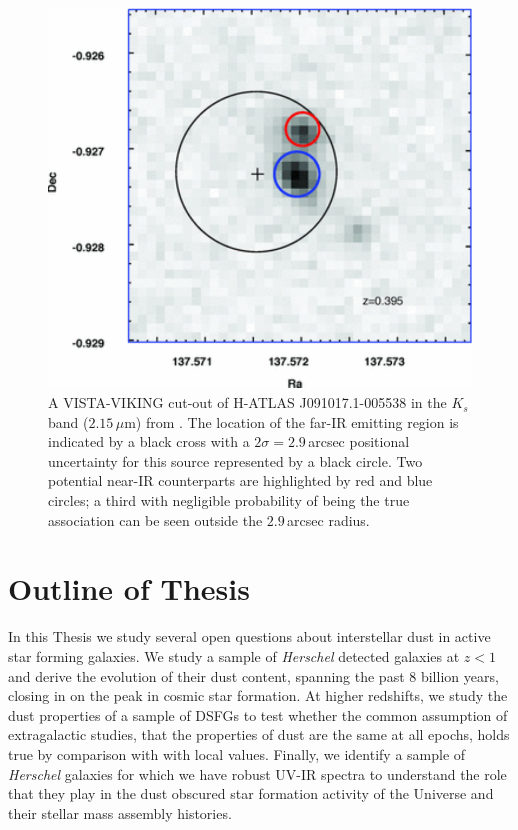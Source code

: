 \begin{figure}
    \centering
	\includegraphics[width=0.75\columnwidth]{Figures/viking_cutout.pdf}
	\caption{A VISTA-VIKING cut-out of H-ATLAS J091017.1-005538 in the $K_s$ band ($2.15\,\mu$m) from \citealt{Fleuren_2012}. The location of the far-IR emitting region is indicated by a black cross with a $2\sigma = 2.9\,$arcsec positional uncertainty for this source represented by a black circle. Two potential near-IR counterparts are highlighted by red and blue circles; a third with negligible probability of being the true association can be seen outside the $2.9\,$arcsec radius.}
	\label{fig:viking_cutout}
\end{figure}

\section{Outline of Thesis}

In this Thesis we study several open questions about interstellar dust in active star forming galaxies. We study a sample of \textit{Herschel} detected galaxies at $z < 1$ and derive the evolution of their dust content, spanning the past $8$ billion years, closing in on the peak in cosmic star formation. At higher redshifts, we study the dust properties of a sample of DSFGs to test whether the common assumption of extragalactic studies, that the properties of dust are the same at all epochs, holds true by comparison with with local values. Finally, we identify a sample of \textit{Herschel} galaxies for which we have robust UV-IR spectra to understand the role that they play in the dust obscured star formation activity of the Universe and their stellar mass assembly histories.

